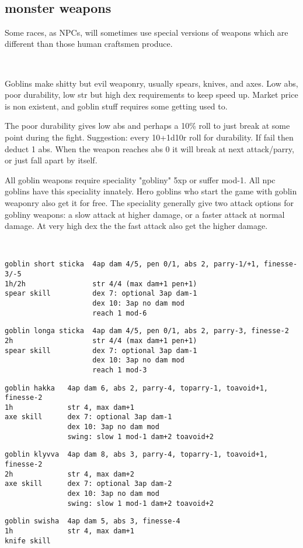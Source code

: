 \


\subsection*{monster weapons}
Some races, as NPCs, will sometimes use special versions of weapons which are different than those human craftsmen produce.

\

\noindent Goblins make shitty but evil weaponry, usually spears, knives, and axes. Low abs, poor durability, low str but high dex requirements to keep speed up. Market price is non existent, and goblin stuff requires some getting used to.

The poor durability gives low abs and perhaps a 10\% roll to just break at some point during the fight. Suggestion: every 10+1d10r roll for durability. If fail then deduct 1 abs. When the weapon reaches abs 0 it will break at next attack/parry, or just fall apart by itself.

All goblin weapons require speciality "gobliny" 5xp or suffer mod-1.
All npc goblins have this speciality innately.
Hero goblins who start the game with goblin weaponry also get it for free.
The speciality generally give two attack options for gobliny weapons:
a slow attack at higher damage, or a faster attack at normal damage.
At very high dex the the fast attack also get the higher damage.

\

\small \begin{samepage} \begin{verbatim}
goblin short sticka  4ap dam 4/5, pen 0/1, abs 2, parry-1/+1, finesse-3/-5
1h/2h                str 4/4 (max dam+1 pen+1)
spear skill          dex 7: optional 3ap dam-1
                     dex 10: 3ap no dam mod
                     reach 1 mod-6
\end{verbatim} \blocklistgap \begin{verbatim}
goblin longa sticka  4ap dam 4/5, pen 0/1, abs 2, parry-3, finesse-2
2h                   str 4/4 (max dam+1 pen+1)
spear skill          dex 7: optional 3ap dam-1
                     dex 10: 3ap no dam mod
                     reach 1 mod-3
\end{verbatim} \blocklistgap \begin{verbatim}
goblin hakka   4ap dam 6, abs 2, parry-4, toparry-1, toavoid+1, finesse-2
1h             str 4, max dam+1
axe skill      dex 7: optional 3ap dam-1
               dex 10: 3ap no dam mod
               swing: slow 1 mod-1 dam+2 toavoid+2
\end{verbatim} \blocklistgap \begin{verbatim}
goblin klyvva  4ap dam 8, abs 3, parry-4, toparry-1, toavoid+1, finesse-2
2h             str 4, max dam+2
axe skill      dex 7: optional 3ap dam-2
               dex 10: 3ap no dam mod
               swing: slow 1 mod-1 dam+2 toavoid+2
\end{verbatim} \blocklistgap \begin{verbatim}
goblin swisha  4ap dam 5, abs 3, finesse-4
1h             str 4, max dam+1
knife skill
\end{verbatim} \end{samepage} \normalsize \goodbreak

